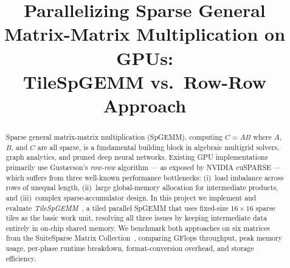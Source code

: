 \documentclass[conference]{IEEEtran}
\begin{document}
\title{Parallelizing Sparse General Matrix-Matrix Multiplication on GPUs:\\
       TileSpGEMM vs.\ Row-Row Approach}

\author{
}

\maketitle

\begin{abstract}
Sparse general matrix-matrix multiplication (\mbox{SpGEMM}), computing
$C = AB$ where $A$, $B$, and $C$ are all sparse, is a fundamental
building block in algebraic multigrid solvers, graph analytics, and
pruned deep neural networks.
Existing GPU implementations primarily use Gustavson's \emph{row-row}
algorithm --- as exposed by NVIDIA cuSPARSE --- which suffers from three
well-known performance bottlenecks: (i)~load imbalance across rows of
unequal length, (ii)~large global-memory allocation for intermediate
products, and (iii)~complex sparse-accumulator design.
In this project we implement and evaluate \emph{TileSpGEMM}~\cite{tilespgemm},
a tiled parallel SpGEMM that uses fixed-size $16\!\times\!16$ sparse tiles
as the basic work unit, resolving all three issues by keeping intermediate
data entirely in on-chip shared memory.
We benchmark both approaches on six matrices from the SuiteSparse
Matrix Collection~\cite{suitesparse}, comparing GFlops throughput,
peak memory usage, per-phase runtime breakdown, format-conversion
overhead, and storage efficiency.
\end{abstract}

\end{document}
